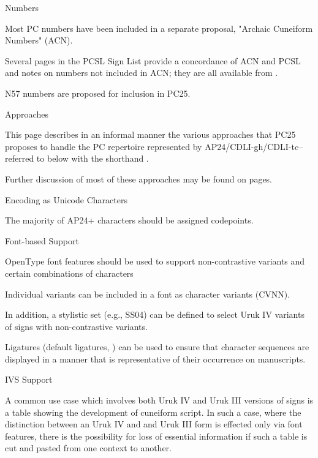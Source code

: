 \Hh{}Numbers


\par Most PC numbers have been included in a separate proposal,
      "Archaic Cuneiform Numbers" (ACN).


\par Several pages in the PCSL Sign List provide a concordance of
      ACN and PCSL and notes on numbers not included in ACN; they are
      all available from .


\par N57 numbers are proposed for inclusion in PC25.

\Hh{}Approaches


\par This page describes in an informal manner the various
      approaches that PC25 proposes to handle the PC repertoire
      represented by AP24/CDLI-gh/CDLI-tc--referred to below with the
      shorthand .


\par Further discussion of most of these approaches may be found
      on  pages.

\Hhhh{}Encoding as Unicode Characters


\par The majority of AP24+ characters should be assigned codepoints.

\Hhhh{}Font-based Support


\par OpenType font features should be used to support
      non-contrastive variants and certain combinations of characters


\par Individual variants can be included in a font as character
      variants (CVNN).


\par In addition, a stylistic set (e.g., SS04) can
      be defined to select Uruk IV variants of signs with
      non-contrastive variants.


\par Ligatures (default ligatures, ) can be used
      to ensure that character sequences are displayed in a manner
      that is representative of their occurrence on manuscripts.

\Hhhh{}IVS Support


\par A common use case which involves both Uruk IV and Uruk III
      versions of signs is a table showing the development of
      cuneiform script.  In such a case, where the distinction between
      an Uruk IV and and Uruk III form is effected only via font
      features, there is the possibility for loss of essential
      information if such a table is cut and pasted from one context
      to another.


